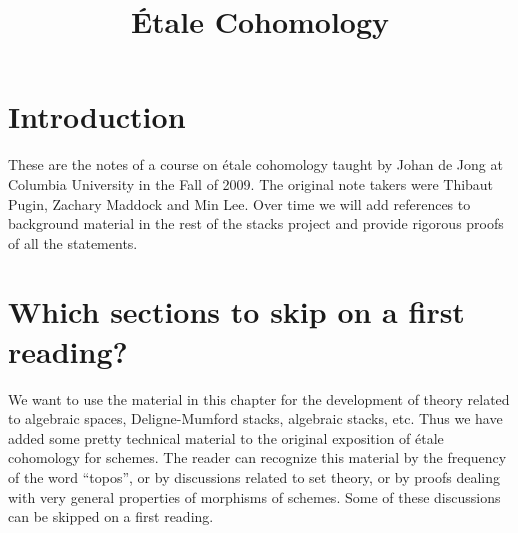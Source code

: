 

%


\title{\'Etale Cohomology}


\maketitle

\label{section-phantom}

\tableofcontents


\section{Introduction}
\label{section-introduction}

\noindent
These are the notes of a course on \'etale cohomology taught by Johan de Jong
at Columbia University in the Fall of 2009. The original note takers were
Thibaut Pugin, Zachary Maddock and Min Lee. Over time we will add references
to background material in the rest of the stacks project and provide rigorous
proofs of all the statements.



\section{Which sections to skip on a first reading?}
\label{section-skip}

\noindent
We want to use the material in this chapter for the development of
theory related to algebraic spaces, Deligne-Mumford stacks, algebraic stacks,
etc. Thus we have added some pretty technical material to the original
exposition of \'etale cohomology for schemes. The reader can recognize this
material by the frequency of the word ``topos'', or by discussions related
to set theory, or by proofs dealing with very general properties of morphisms
of schemes. Some of these discussions can be skipped on a first reading.

